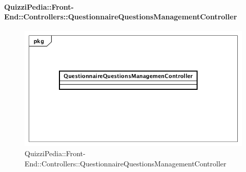 \paragraph{QuizziPedia::Front-End::Controllers::QuestionnaireQuestionsManagementController}
\begin{figure}
	\centering
	\includegraphics[scale=0.45]{UML/Classi/Front-End/QuizziPedia_Front-end_Controller_QuestionnaireQuestionsManagementController.png}
	\caption{QuizziPedia::Front-End::Controllers::QuestionnaireQuestionsManagementController}
\end{figure}
